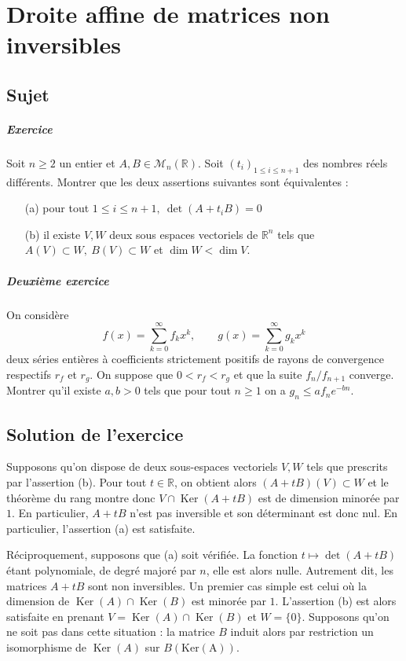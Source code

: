 \chapter{Droite affine de matrices non inversibles}

\section{Sujet}

\paragraph{Exercice}
Soit $n \geqslant 2$ un entier et $A,B \in \mathscr M_n(\mathbb R)$. Soit $(t_i)_{1\leqslant i \leqslant n+1}$ des nombres réels différents. Montrer que les deux assertions suivantes sont équivalentes :
\begin{enumerate}
    \item[(a)] pour tout $1 \leqslant i \leqslant n+1,\ \det(A+t_iB) = 0$
    \item[(b)] il existe $V,W$ deux sous espaces vectoriels de $\mathbb R^n$ tels que $A(V) \subset W,\ B(V) \subset W$ et $\dim W < \dim V$.
\end{enumerate}

\paragraph{Deuxième exercice}
On considère
$$
f(x) = \sum_{k=0}^{\infty} f_k x^k,
\qquad
g(x) = \sum_{k=0}^{\infty} g_k x^k
$$
deux séries entières à coefficients strictement positifs de rayons de convergence respectifs $r_f$ et $r_g$.
On suppose que $0 < r_f < r_g$ et que la suite $f_n/f_{n+1}$ converge.
Montrer qu'il existe $a,b > 0$ tels que pour tout $n \geqslant 1$ on a $g_n \leqslant a f_n e^{-bn}$.

\section{Solution de l'exercice} %

Supposons qu'on dispose de deux sous-espaces vectoriels $V,W$ tels que prescrits par l'assertion (b). Pour tout $t \in \mathbb R$, on obtient alors $(A+tB)(V) \subset W$ et le théorème du rang montre donc $V \cap \operatorname{Ker}(A+tB)$ est de dimension minorée par $1$. En particulier, $A+tB$ n'est pas inversible et son déterminant est donc nul. En particulier, l'assertion (a) est satisfaite.

Réciproquement, supposons que (a) soit vérifiée. La fonction $t \mapsto \det(A + tB)$ étant polynomiale, de degré majoré par $n$, elle est alors nulle. Autrement dit, les matrices $A+tB$ sont non inversibles.
Un premier cas simple est celui où la dimension de $\operatorname{Ker}(A) \cap \operatorname{Ker}(B)$ est minorée par $1$.
L'assertion (b) est alors satisfaite en prenant $V=\operatorname{Ker}(A) \cap \operatorname{Ker}(B)$ et $W = \{0\}$.
Supposons qu'on ne soit pas dans cette situation :  la matrice $B$ induit alors par restriction un isomorphisme de $\operatorname{Ker}(A)$ sur $B(\operatorname{Ker(A)})$.

